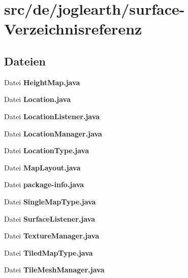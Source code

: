 \section{src/de/joglearth/surface-\/\-Verzeichnisreferenz}
\label{dir_0593699623580ed45eb7c8c30322f30a}
\subsection*{Dateien}
\begin{DoxyCompactItemize}
\item 
Datei {\bfseries Height\-Map.\-java}
\item 
Datei {\bfseries Location.\-java}
\item 
Datei {\bfseries Location\-Listener.\-java}
\item 
Datei {\bfseries Location\-Manager.\-java}
\item 
Datei {\bfseries Location\-Type.\-java}
\item 
Datei {\bfseries Map\-Layout.\-java}
\item 
Datei {\bfseries package-\/info.\-java}
\item 
Datei {\bfseries Single\-Map\-Type.\-java}
\item 
Datei {\bfseries Surface\-Listener.\-java}
\item 
Datei {\bfseries Texture\-Manager.\-java}
\item 
Datei {\bfseries Tiled\-Map\-Type.\-java}
\item 
Datei {\bfseries Tile\-Mesh\-Manager.\-java}
\end{DoxyCompactItemize}
